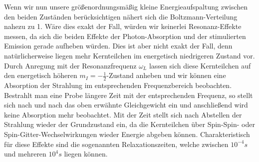 Wenn wir nun unsere größenordnungsmäßig kleine Energieaufspaltung zwischen den beiden Zuständen berücksichtigen nähert sich die Boltzmann-Verteilung nahezu zu 1. Wäre dies exakt der Fall, würden wir keinerlei Resonanz-Effekte messen, da sich die beiden Effekte der Photon-Absorption und der stimulierten Emission gerade aufheben würden. Dies ist aber nicht exakt der Fall, denn natürlicherweise liegen mehr Kernteilchen im energetisch niedrigeren Zustand vor. Durch Anregung mit der Resonanzfrequenz $\omega_L$ lassen sich diese Kernteilchen auf den energetisch höheren $m_I=-\frac{1}{2}$-Zustand anheben und wir können eine Absorption der Strahlung im entsprechenden Frequenzbereich beobachten. Bestrahlt man eine Probe längere Zeit mit der entsprechenden Frequenz, so stellt sich nach und nach das oben erwähnte Gleichgewicht ein und anschließend wird keine Absorption mehr  beobachtet. Mit der Zeit stellt sich nach Abstellen der Strahlung wieder der Grundzustand ein, da die Kernteilchen über Spin-Spin- oder Spin-Gitter-Wechselwirkungen wieder Energie abgeben können. Charakteristisch für diese Effekte sind die sogenannten Relaxationszeiten, welche zwischen $10^{-4}s$ und mehreren $10^4s$ liegen können.
